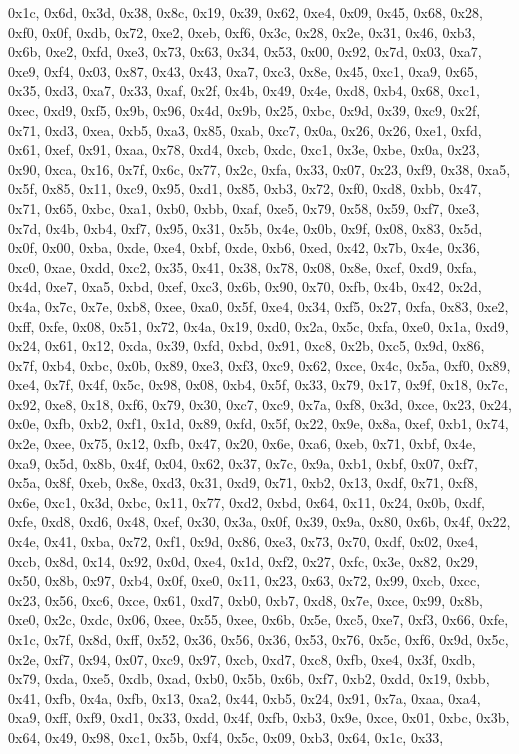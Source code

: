 \documentclass[
]{book}
\begin{document}
0x1c, 0x6d, 0x3d, 0x38, 0x8c, 0x19, 0x39, 0x62, 0xe4, 0x09, 0x45, 0x68, 0x28, 0xf0, 0x0f, 0xdb, 0x72, 0xe2, 0xeb, 0xf6, 0x3c, 0x28, 0x2e, 0x31, 0x46, 0xb3, 0x6b, 0xe2, 0xfd, 0xe3, 0x73, 0x63, 0x34, 0x53, 0x00, 0x92, 0x7d, 0x03, 0xa7, 0xe9, 0xf4, 0x03, 0x87, 0x43, 0x43, 0xa7, 0xc3, 0x8e, 0x45, 0xc1, 0xa9, 0x65, 0x35, 0xd3, 0xa7, 0x33, 0xaf, 0x2f, 0x4b, 0x49, 0x4e, 0xd8, 0xb4, 0x68, 0xc1, 0xec, 0xd9, 0xf5, 0x9b, 0x96, 0x4d, 0x9b, 0x25, 0xbc, 0x9d, 0x39, 0xc9, 0x2f, 0x71, 0xd3, 0xea, 0xb5, 0xa3, 0x85,
0xab, 0xc7, 0x0a, 0x26, 0x26, 0xe1, 0xfd, 0x61, 0xef, 0x91, 0xaa, 0x78, 0xd4, 0xcb, 0xdc, 0xc1, 0x3e, 0xbe, 0x0a, 0x23, 0x90, 0xca, 0x16, 0x7f, 0x6c, 0x77, 0x2c, 0xfa, 0x33, 0x07, 0x23, 0xf9, 0x38, 0xa5, 0x5f, 0x85, 0x11, 0xc9, 0x95, 0xd1, 0x85, 0xb3, 0x72, 0xf0, 0xd8, 0xbb, 0x47, 0x71, 0x65, 0xbc, 0xa1, 0xb0, 0xbb, 0xaf, 0xe5, 0x79, 0x58, 0x59, 0xf7, 0xe3, 0x7d, 0x4b, 0xb4, 0xf7, 0x95, 0x31, 0x5b, 0x4e, 0x0b, 0x9f, 0x08, 0x83, 0x5d, 0x0f, 0x00, 0xba, 0xde, 0xe4, 0xbf, 0xde, 0xb6, 0xed, 0x42, 0x7b,
0x4e, 0x36, 0xc0, 0xae, 0xdd, 0xc2, 0x35, 0x41, 0x38, 0x78, 0x08, 0x8e, 0xcf, 0xd9, 0xfa, 0x4d, 0xe7, 0xa5, 0xbd, 0xef, 0xc3, 0x6b, 0x90, 0x70, 0xfb, 0x4b, 0x42, 0x2d, 0x4a, 0x7c, 0x7e, 0xb8, 0xee, 0xa0, 0x5f, 0xe4, 0x34, 0xf5, 0x27, 0xfa, 0x83, 0xe2, 0xff, 0xfe, 0x08, 0x51, 0x72, 0x4a, 0x19, 0xd0, 0x2a, 0x5c, 0xfa, 0xe0, 0x1a, 0xd9, 0x24, 0x61, 0x12, 0xda, 0x39, 0xfd, 0xbd, 0x91, 0xc8, 0x2b, 0xc5, 0x9d, 0x86, 0x7f, 0xb4, 0xbc, 0x0b, 0x89, 0xe3, 0xf3, 0xc9, 0x62, 0xce, 0x4c, 0x5a, 0xf0, 0x89, 0xe4,
0x7f, 0x4f, 0x5c, 0x98, 0x08, 0xb4, 0x5f, 0x33, 0x79, 0x17, 0x9f, 0x18, 0x7c, 0x92, 0xe8, 0x18, 0xf6, 0x79, 0x30, 0xc7, 0xc9, 0x7a, 0xf8, 0x3d, 0xce, 0x23, 0x24, 0x0e, 0xfb, 0xb2, 0xf1, 0x1d, 0x89, 0xfd, 0x5f, 0x22, 0x9e, 0x8a, 0xef, 0xb1, 0x74, 0x2e, 0xee, 0x75, 0x12, 0xfb, 0x47, 0x20, 0x6e, 0xa6, 0xeb, 0x71, 0xbf, 0x4e, 0xa9, 0x5d, 0x8b, 0x4f, 0x04, 0x62, 0x37, 0x7c, 0x9a, 0xb1, 0xbf, 0x07, 0xf7, 0x5a, 0x8f, 0xeb, 0x8e, 0xd3, 0x31, 0xd9, 0x71, 0xb2, 0x13, 0xdf, 0x71, 0xf8, 0x6e, 0xc1, 0x3d, 0xbc,
0x11, 0x77, 0xd2, 0xbd, 0x64, 0x11, 0x24, 0x0b, 0xdf, 0xfe, 0xd8, 0xd6, 0x48, 0xef, 0x30, 0x3a, 0x0f, 0x39, 0x9a, 0x80, 0x6b, 0x4f, 0x22, 0x4e, 0x41, 0xba, 0x72, 0xf1, 0x9d, 0x86, 0xe3, 0x73, 0x70, 0xdf, 0x02, 0xe4, 0xcb, 0x8d, 0x14, 0x92, 0x0d, 0xe4, 0x1d, 0xf2, 0x27, 0xfc, 0x3e, 0x82, 0x29, 0x50, 0x8b, 0x97, 0xb4, 0x0f, 0xe0, 0x11, 0x23, 0x63, 0x72, 0x99, 0xcb, 0xcc, 0x23, 0x56, 0xc6, 0xce, 0x61, 0xd7, 0xb0, 0xb7, 0xd8, 0x7e, 0xce, 0x99, 0x8b, 0xe0, 0x2c, 0xdc, 0x06, 0xee, 0x55, 0xee, 0x6b, 0x5e,
0xc5, 0xe7, 0xf3, 0x66, 0xfe, 0x1c, 0x7f, 0x8d, 0xff, 0x52, 0x36, 0x56, 0x36, 0x53, 0x76, 0x5c, 0xf6, 0x9d, 0x5c, 0x2e, 0xf7, 0x94, 0x07, 0xc9, 0x97, 0xcb, 0xd7, 0xc8, 0xfb, 0xe4, 0x3f, 0xdb, 0x79, 0xda, 0xe5, 0xdb, 0xad, 0xb0, 0x5b, 0x6b, 0xf7, 0xb2, 0xdd, 0x19, 0xbb, 0x41, 0xfb, 0x4a, 0xfb, 0x13, 0xa2, 0x44, 0xb5, 0x24, 0x91, 0x7a, 0xaa, 0xa4, 0xa9, 0xff, 0xf9, 0xd1, 0x33, 0xdd, 0x4f, 0xfb, 0xb3, 0x9e, 0xce, 0x01, 0xbc, 0x3b, 0x64, 0x49, 0x98, 0xc1, 0x5b, 0xf4, 0x5c, 0x09, 0xb3, 0x64, 0x1c, 0x33,
\end{document}
